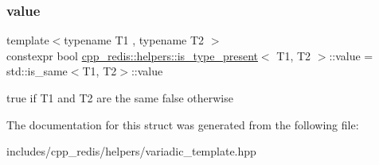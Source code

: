 \subsubsection{\texorpdfstring{value}{value}}
{\footnotesize\ttfamily template$<$typename T1 , typename T2 $>$ \\
constexpr bool \mbox{\hyperlink{structcpp__redis_1_1helpers_1_1is__type__present}{cpp\+\_\+redis\+::helpers\+::is\+\_\+type\+\_\+present}}$<$ T1, T2 $>$\+::value = std\+::is\+\_\+same$<$T1, T2$>$\+::value\hspace{0.3cm}{\ttfamily [static]}}

true if T1 and T2 are the same false otherwise 

The documentation for this struct was generated from the following file\+:\begin{DoxyCompactItemize}
\item 
includes/cpp\+\_\+redis/helpers/variadic\+\_\+template.\+hpp\end{DoxyCompactItemize}
